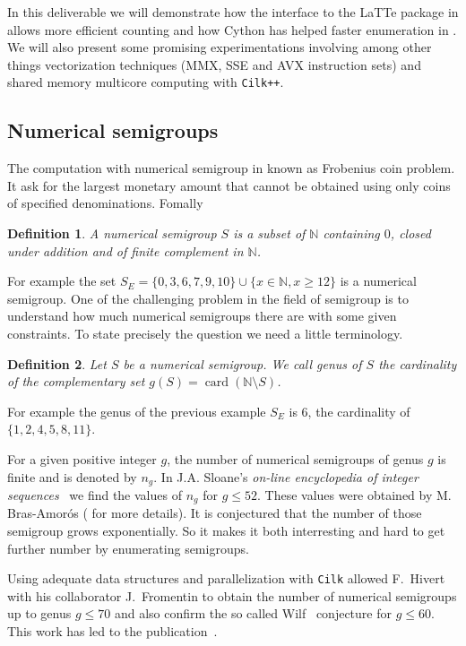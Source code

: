 \documentclass{deliverablereport}
\newcommand{\Cilk}{\texttt{Cilk}\xspace}
\newcommand{\CilkP}{\texttt{Cilk++}\xspace}
\newcommand{\NN}{\mathbb{N}}
\newtheorem{defi}{Definition}
\begin{document}
In this deliverable we will demonstrate how the interface to the LaTTe package
in \Sage allows more efficient counting and how Cython has helped faster enumeration
in \Sage. We will also present some promising experimentations involving among
other things vectorization techniques (MMX, SSE and AVX instruction sets) and
shared memory multicore computing with \CilkP.

\subsection{Numerical semigroups}

The computation with numerical semigroup in known as Frobenius coin
problem. It ask for the largest monetary amount that cannot be obtained using
only coins of specified denominations. Fomally
\begin{defi}
  A \emph{numerical semigroup} $S$ is a subset of $\NN$ containing $0$, closed
  under addition and of finite complement in $\NN$.
\end{defi}
For example the set $S_E=\{0,3,6,7,9,10\}\cup\{x\in\NN, x\geq 12\}$
is a numerical semigroup. One of the challenging problem in the field of
semigroup is to understand how much numerical semigroups there are with some
given constraints. To state precisely the question we need a little
terminology.
\begin{defi}
  Let $S$ be a numerical semigroup. We call \emph{genus} of $S$ the
  cardinality of the complementary set $g(S)=\operatorname{card}(\NN\setminus
  S)$.
\end{defi}
For example the genus of the previous example $S_E$ is $6$, the cardinality of
$\{1,2,4,5,8,11\}$.

For a given positive integer $g$, the number of numerical semigroups of genus
$g$ is finite and is denoted by $n_g$. In J.A. Sloane's \emph{on-line
encyclopedia of integer sequences}~\cite{OEIS} we find the values of $n_g$
for $g\leq 52$. These values were obtained by M. Bras-Amor\'os
(\cite{BrasAmoros2008} for more details). It is conjectured that the number of
those semigroup grows exponentially. So it makes it both interresting and hard
to get further number by enumerating semigroups.

Using adequate data structures and parallelization with \Cilk allowed
F.~Hivert with his collaborator J.~Fromentin to obtain the number of numerical
semigroups up to genus $g \leq 70$ and also confirm the so called
Wilf~\cite{Wilf} conjecture for $g \leq 60$. This work has led to the
publication~\cite{FromentinH16}.
\end{document}
